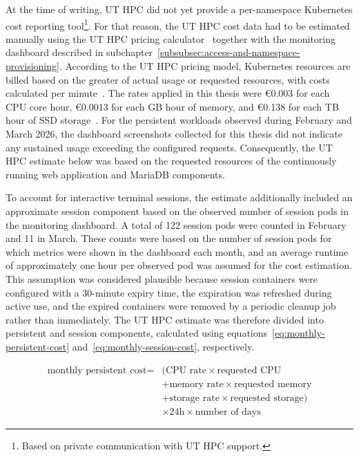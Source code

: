 At the time of writing, UT HPC did not yet provide a per-namespace Kubernetes cost reporting tool\footnote{Based on private communication with UT HPC support.}.
For that reason, the UT HPC cost data had to be estimated manually using the UT HPC pricing calculator~\cite{ut_hpc_calculate_your_cost} together with the monitoring dashboard described in subchapter~\ref{subsubsec:access-and-namespace-provisioning}.
According to the UT HPC pricing model, Kubernetes resources are billed based on the greater of actual usage or requested resources, with costs calculated per minute~\cite{ut_hpc_calculate_your_cost}.
The rates applied in this thesis were €0.003 for each CPU core hour, €0.0013 for each GB hour of memory, and €0.138 for each TB hour of SSD storage~\cite{ut_hpc_calculate_your_cost}.
For the persistent workloads observed during February and March 2026, the dashboard screenshots collected for this thesis did not indicate any sustained usage exceeding the configured requests.
Consequently, the UT HPC estimate below was based on the requested resources of the continuously running web application and MariaDB components.

To account for interactive terminal sessions, the estimate additionally included an approximate session component based on the observed number of session pods in the monitoring dashboard.
A total of 122 session pods were counted in February and 11 in March.
These counts were based on the number of session pods for which metrics were shown in the dashboard each month, and an average runtime of approximately one hour per observed pod was assumed for the cost estimation.
This assumption was considered plausible because session containers were configured with a 30-minute expiry time, the expiration was refreshed during active use, and the expired containers were removed by a periodic cleanup job rather than immediately.
The UT HPC estimate was therefore divided into persistent and session components, calculated using equations~\ref{eq:monthly-persistent-cost} and~\ref{eq:monthly-session-cost}, respectively.

\begin{equation}
  \begin{aligned}
    \text{monthly persistent cost} ={}& (\text{CPU rate} \times \text{requested CPU} \\
    &+ \text{memory rate} \times \text{requested memory} \\
    &+ \text{storage rate} \times \text{requested storage}) \\
    &\times 24\text{h} \times \text{number of days}
  \end{aligned}
  \label{eq:monthly-persistent-cost}
\end{equation}

